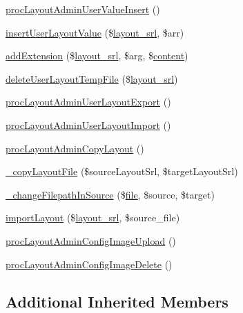 \begin{DoxyCompactItemize}
\item 
\hyperlink{classlayoutAdminController_a082aafb8b2911065e3bf5a025aa2be22}{proc\+Layout\+Admin\+User\+Value\+Insert} ()
\item 
\hyperlink{classlayoutAdminController_aac54b67b3c534c9f900ac729c637fe75}{insert\+User\+Layout\+Value} (\$\hyperlink{ko_8install_8php_a70054876db09b2519a1726663c8dd9e7}{layout\+\_\+srl}, \$arr)
\item 
\hyperlink{classlayoutAdminController_abbe4f51bbf4925b60d6cf966117d9c6a}{add\+Extension} (\$\hyperlink{ko_8install_8php_a70054876db09b2519a1726663c8dd9e7}{layout\+\_\+srl}, \$arg, \$\hyperlink{classcontent}{content})
\item 
\hyperlink{classlayoutAdminController_a993e68df95066c306c09b550ac705b1e}{delete\+User\+Layout\+Temp\+File} (\$\hyperlink{ko_8install_8php_a70054876db09b2519a1726663c8dd9e7}{layout\+\_\+srl})
\item 
\hyperlink{classlayoutAdminController_a51cfe704e67bb01f9f3e471f097e5684}{proc\+Layout\+Admin\+User\+Layout\+Export} ()
\item 
\hyperlink{classlayoutAdminController_a82cf560f92d64e4d76e90c969ebcda70}{proc\+Layout\+Admin\+User\+Layout\+Import} ()
\item 
\hyperlink{classlayoutAdminController_afaf005eb86d8c09e2c610f743dbb1522}{proc\+Layout\+Admin\+Copy\+Layout} ()
\item 
\hyperlink{classlayoutAdminController_a0663f5b179989279c5c73a3badd12c1c}{\+\_\+copy\+Layout\+File} (\$source\+Layout\+Srl, \$target\+Layout\+Srl)
\item 
\hyperlink{classlayoutAdminController_a9dd8cb93d56db698fd6426a11dad6056}{\+\_\+change\+Filepath\+In\+Source} (\$\hyperlink{classfile}{file}, \$source, \$target)
\item 
\hyperlink{classlayoutAdminController_a2ef8e75c33c7e33102beaa0051a0d113}{import\+Layout} (\$\hyperlink{ko_8install_8php_a70054876db09b2519a1726663c8dd9e7}{layout\+\_\+srl}, \$source\+\_\+file)
\item 
\hyperlink{classlayoutAdminController_a24154a31e823e961c03d808257147700}{proc\+Layout\+Admin\+Config\+Image\+Upload} ()
\item 
\hyperlink{classlayoutAdminController_ae6b9af868b9694fc6ad85c9496595d24}{proc\+Layout\+Admin\+Config\+Image\+Delete} ()
\end{DoxyCompactItemize}
\subsection*{Additional Inherited Members}



